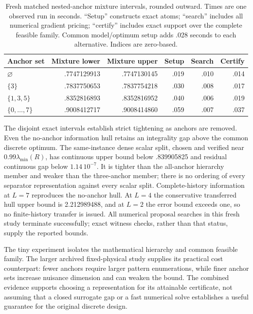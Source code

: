 \begin{table}[htbp]
\centering\small
\caption{Fresh matched nested-anchor mixture intervals, rounded outward.
Times are one observed run in seconds. ``Setup'' constructs exact atoms;
``search'' includes all numerical gradient pricing; ``certify'' includes exact
support over the complete feasible family. Common model/optimum setup adds
.028 seconds to each alternative. Indices are zero-based.}
\label{tab:nested-fresh}
\begin{tabular}{lrrrrr}
\toprule
Anchor set & Mixture lower & Mixture upper & Setup & Search & Certify\\
\midrule
$\varnothing$ & .7747129913 & .7747130145 & .019 & .010 & .014\\
$\{3\}$ & .7837750653 & .7837754218 & .030 & .008 & .017\\
$\{1,3,5\}$ & .8352816893 & .8352816952 & .040 & .006 & .019\\
$\{0,\ldots,7\}$ & .9008412717 & .9008414860 & .059 & .007 & .037\\
\bottomrule
\end{tabular}
\end{table}

The disjoint exact intervals establish strict tightening as anchors are removed.
Even the no-anchor information hull retains an integrality gap above the
common discrete optimum. The same-instance dense scalar split, chosen and
verified near $0.99\lambda_{\min}(R)$, has continuous upper bound below
.839905825 and residual continuous gap below $1.14\,10^{-7}$. It is tighter
than the all-anchor hierarchy member and weaker than the three-anchor member;
there is no ordering of every separator representation against every scalar
split. Complete-history information at $L=7$ reproduces the no-anchor hull.
At $L=4$ the conservative transferred hull upper bound is 2.212989488, and at
$L=2$ the error bound exceeds one, so no finite-history transfer is issued.
All numerical proposal searches in this fresh study terminate successfully;
exact witness checks, rather than that status, supply the reported bounds.

The tiny experiment isolates the mathematical hierarchy and common feasible
family. The larger archived fixed-physical study supplies its practical cost
counterpart: fewer anchors require larger pattern enumerations, while finer
anchor sets increase nuisance dimension and can weaken the bound. The combined
evidence supports choosing a representation for its attainable certificate,
not assuming that a closed surrogate gap or a fast numerical solve establishes
a useful guarantee for the original discrete design.
